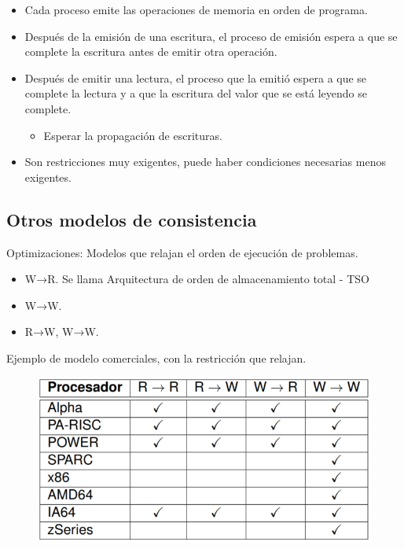 \documentclass[12pt, twoside, openright]{report} %
\begin{document}
    \begin{itemize}
    
    \item
      Cada proceso emite las operaciones de memoria en orden de
      programa.
    \item
      Después de la emisión de una escritura, el proceso de emisión
      espera a que se complete la escritura antes de emitir otra
      operación.
    \item
      Después de emitir una lectura, el proceso que la emitió espera a
      que se complete la lectura y a que la escritura del valor que se
      está leyendo se complete.

      \begin{itemize}
      
      \item
        Esperar la propagación de escrituras.
      \end{itemize}
    \item
      Son restricciones muy exigentes, puede haber condiciones
      necesarias menos exigentes.
    \end{itemize}

\subsection{Otros modelos de consistencia}

 
    Optimizaciones: Modelos que relajan el orden de ejecución de
    problemas.

    \begin{itemize}
    
    \item
      W→R. Se llama Arquitectura de orden de almacenamiento total -
      TSO
    \item
      W→W.
    \item
      R→W, W→W.
    \end{itemize}
\pagebreak
    Ejemplo de modelo comerciales, con la restricción que relajan.
    \begin{figure}[H]
      {\includegraphics[scale=.5]{Untitled 60.png}}
    \end{figure}
\end{document}
